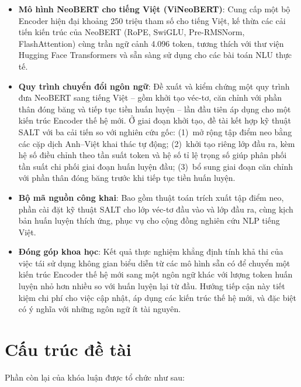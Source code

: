 \begin{itemize}
    \item \textbf{Mô hình NeoBERT cho tiếng Việt (ViNeoBERT)}: Cung cấp một bộ Encoder
    hiện đại khoảng 250 triệu tham số cho tiếng Việt, kế thừa các cải tiến kiến trúc
    của NeoBERT (RoPE, SwiGLU, Pre-RMSNorm, FlashAttention) cùng trần ngữ cảnh
    4.096 token, tương thích với thư viện Hugging Face Transformers và sẵn sàng sử
    dụng cho các bài toán NLU thực tế.

    \item \textbf{Quy trình chuyển đổi ngôn ngữ}: Đề xuất và kiểm chứng một
    quy trình đưa NeoBERT sang tiếng Việt -- gồm khởi tạo véc-tơ, căn chỉnh với phần thân
    đóng băng và tiếp tục tiền huấn luyện -- lần đầu tiên áp dụng cho một kiến trúc Encoder
    thế hệ mới. Ở giai đoạn khởi tạo, đề tài kết hợp kỹ thuật SALT với ba cải tiến so với
    nghiên cứu gốc: (1)~mở rộng tập điểm neo bằng các cặp dịch Anh--Việt khai thác tự động;
    (2)~khởi tạo riêng lớp đầu ra, kèm hệ số điều chỉnh theo tần suất token và hệ số
    tỉ lệ trọng số giúp phân phối tần suất chi phối giai đoạn huấn luyện đầu; (3)~bổ sung giai
    đoạn căn chỉnh với phần thân đóng băng trước khi tiếp tục tiền huấn luyện.

    \item \textbf{Bộ mã nguồn công khai}: Bao gồm thuật toán trích xuất tập điểm neo,
    phần cài đặt kỹ thuật SALT cho lớp véc-tơ đầu vào và lớp đầu ra, cùng kịch bản huấn luyện
    thích ứng, phục vụ cho cộng đồng nghiên cứu NLP tiếng Việt.

    \item \textbf{Đóng góp khoa học}: Kết quả thực nghiệm khẳng định tính khả thi
    của việc tái sử dụng không gian biểu diễn từ các mô hình sẵn có để chuyển một
    kiến trúc Encoder thế hệ mới sang một ngôn ngữ khác với lượng token huấn luyện
    nhỏ hơn nhiều so với huấn luyện lại từ đầu. Hướng
    tiếp cận này tiết kiệm chi phí cho việc cập nhật, áp dụng các kiến trúc thế hệ
    mới, và đặc biệt có ý nghĩa với những ngôn ngữ ít tài nguyên.
\end{itemize}

\section{Cấu trúc đề tài}
\label{sec:structure}

Phần còn lại của khóa luận được tổ chức như sau:

